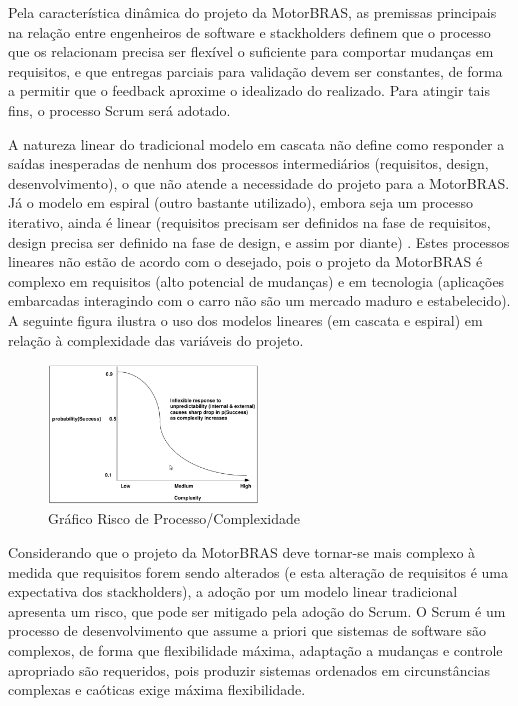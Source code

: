 \documentclass[12pt,journal,compsoc]{IEEEtran}
\begin{document}
Pela característica dinâmica do projeto da MotorBRAS, as premissas principais na relação entre engenheiros de software e stackholders definem que o processo que os relacionam precisa ser flexível o suficiente para comportar mudanças em requisitos, e que entregas parciais para validação devem ser constantes, de forma a permitir que o feedback aproxime o idealizado do realizado. Para atingir tais fins, o processo Scrum será adotado. 

A natureza linear do tradicional modelo em cascata não define como responder a saídas inesperadas de nenhum dos processos intermediários (requisitos, design, desenvolvimento), o que não atende a necessidade do projeto para a MotorBRAS. Já o modelo em espiral (outro bastante utilizado), embora seja um processo iterativo, ainda é linear (requisitos precisam ser definidos na fase de requisitos, design precisa ser definido na fase de design, e assim por diante) \cite{scrum_development_process}. Estes processos lineares não estão de acordo com o desejado, pois o projeto da MotorBRAS é complexo em requisitos (alto potencial de mudanças) e em tecnologia (aplicações embarcadas interagindo com o carro não são um mercado maduro e estabelecido). A seguinte figura ilustra o uso dos modelos lineares (em cascata e espiral) em relação à complexidade das variáveis do projeto. 

\begin{figure}[ht!]
\centering
\includegraphics[width=0.5\textwidth]{scrum_risk_complexity_graph}
\caption{Gráfico Risco de Processo/Complexidade \cite{scrum_development_process}}
\label{fig:scrum_risk_complexity_graph}
\end{figure}

Considerando que o projeto da MotorBRAS deve tornar-se mais complexo à medida que requisitos forem sendo alterados (e esta alteração de requisitos é uma expectativa dos stackholders), a adoção por um modelo linear tradicional apresenta um risco, que pode ser mitigado pela adoção do Scrum. O Scrum é um processo de desenvolvimento que assume a priori que sistemas de software são complexos, de forma que flexibilidade máxima, adaptação a mudanças e controle apropriado são requeridos, pois produzir sistemas ordenados em circunstâncias complexas e caóticas exige máxima flexibilidade. \cite{scrum_development_process} 
\end{document}
